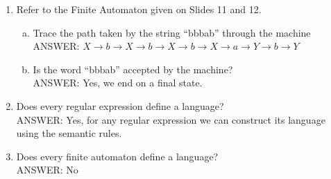 \documentclass{article}
\begin{document}
\begin{enumerate}[1.]
\begin{itemize}
            \item $\bm{ab^*}$ is a regular expression by Syntax Rule 2.1 and
                $\{a, ab, abb, abbb, \dots\}$ is its language by Semantic Rule
                2.1 [product set of $\{a\}$ and $\{\Lambda, b, bb, bbb,
                \dots\}$]

            \item $\bm{a^*}$ is a regular expression by Syntax Rule 2.3 and
                $\{\Lambda, a, aa, aaa, \dots\}$ is its language by Semantic
                Rule 2.3 [Closure of $\{a\}$ under concatenation]

            \item $\bm{ba^*}$ is a regular expression by Syntax Rule 2.1 and
                $\{b, ba, baa, baaa, \dots\}$ is its language by Semantic Rule
                2.1 [product set of $\{b\}$ and $\{\Lambda, a, aa, aaa,
                \dots\}$]

            \item $\bm{ab^* + ba^*}$ is a regular expression by Syntax Rule 2.2 and
                $\{\Lambda, a, b, ab, ba, aab, baa, aaab, baaa, \dots\}$ is its language by Semantic Rule
                2.2 [union of \{a, ab, abb, abbb, \dots\} and \{b, ba, baa, baaa, \dots\}]

            \item $\bm{(ab^* + ba^*)}$ is a regular expression by Syntax Rule
                2.0 and $\{\Lambda, a, b, ab, ba, aab, baa, aaab, baaa, \dots\}$
                continues to be its associated language
        \end{itemize}

    \item Refer to the Finite Automaton given on Slides 11 and 12.
        \begin{enumerate}[a)]
            \item Trace the path taken by the string ``bbbab'' through the
                machine \\
                ANSWER: $X \to b \to X \to b \to X \to b \to X \to a \to Y \to b \to Y$
            \item Is the word ``bbbab'' accepted by the machine? \\
                ANSWER: Yes, we end on a final state.
        \end{enumerate}

    \item Does every regular expression define a language? \\
        ANSWER: Yes, for any regular expression we can construct its language
        using the semantic rules.
    \item Does every finite automaton define a language? \\
        ANSWER: No


\end{enumerate}
\end{document}
